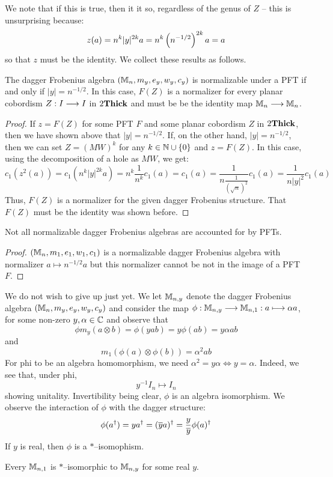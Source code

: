 \documentclass[./Thick_TQFTs_and_Quantum_Information.tex]{subfiles}
\begin{document}
We note that if this is true, then it it so, regardless of the genus of $Z$ --
this is unsurprising because:
\[
  z(a) = n^k|y|^{2k} a = n^k \left( n^{-1/2} \right)^{2k} a = a
\]
so that $z$ must be the identity. We collect these results as follows.
\begin{thm}\label{pftnorm}
The dagger Frobenius algebra $(\mathbb{M}_n, m_y, e_y, w_y, c_y)$ is normalizable under
a PFT if and only if $|y| = n^{-1/2}$. In this case, $F(Z)$ is a normalizer for
every planar cobordism $Z : I \stackrel{}{\longrightarrow} I$ in $2\textbf{Thick}$ and must be be the identity
map $\mathbb{M}_n \stackrel{}{\longrightarrow} \mathbb{M}_n$.
\end{thm}
\begin{proof}
If $z = F(Z)$ for some PFT $F$ and some planar cobordism $Z$ in $2\textbf{Thick}$, then
we have shown above that $|y| = n^{-1/2}$. If, on the other hand,
$|y| = n^{-1/2}$, then we can set $Z = (MW)^k$ for any $k \in \N \cup \set{0}$
and $z = F(Z)$. In this case, using the decomposition of a hole as $MW$, we
get:
\[
  c_1(z^2(a)) = c_1(n^k|y|^{2k} a) = n^k \frac{1}{n^k} c_1(a) = c_1(a)
    = \frac{1}{n \frac{1}{(\sqrt{n})^2}} c_1(a)
    = \frac{1}{n|y|^2} c_1(a)
\]
Thus, $F(Z)$ is a normalizer for the given dagger Frobenius structure. That
$F(Z)$ must be the identity was shown before.
\end{proof}

\begin{cor}
Not all normalizable dagger Frobenius algebras are accounted for by PFTs.
\end{cor}
\begin{proof}
$(\mathbb{M}_n, m_1, e_1, w_1, c_1)$ is a normalizable dagger Frobenius algebra with
normalizer $a \mapsto n^{-1/2} a$ but this normalizer cannot be not in the
image of a PFT $F$.
\end{proof}

We do not wish to give up just yet. We let $\mathbb{M}_{n, y}$ denote the dagger
Frobenius algebra $(\mathbb{M}_n, m_y, e_y, w_y, c_y)$ and consider the map
$\phi : \mathbb{M}_{n, y} \stackrel{}{\longrightarrow} \mathbb{M}_{n, 1} : a \longmapsto \alpha a$, for some non-zero
$y, \alpha \in \mathbb{C}$ and observe that
\[
  \phi m_y(a \otimes b) = \phi(yab) = y\phi(ab) = y\alpha ab
\]
and
\[
  m_1(\phi(a) \otimes \phi(b)) = \alpha^2 ab
\]
For phi to be an algebra homomorphism, we need $\alpha^2 = y\alpha \iff y =
\alpha$. Indeed, we see that, under phi,
\[
  y^{-1}I_n \mapsto I_n
\]
showing unitality. Invertibility being clear, $\phi$ is an algebra isomorphism.
We observe the interaction of $\phi$ with the dagger structure:
\[
  \phi(a^{\dagger}) = ya^{\dagger} = (\overline{y}a)^{\dagger} =
    \frac{y}{\overline{y}}\phi(a)^{\dagger}
\]
If $y$ is real, then $\phi$ is a $*$--isomophism.
\begin{thm}
Every $\mathbb{M}_{n, 1}$ is $*$--isomorphic to $\mathbb{M}_{n, y}$ for some real $y$.
\end{thm}
\end{document}
